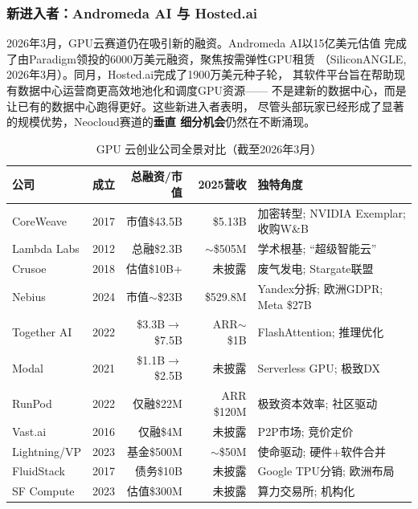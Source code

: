 \subsubsection{新进入者：Andromeda AI 与 Hosted.ai}
2026年3月，GPU云赛道仍在吸引新的融资。Andromeda AI以15亿美元估值
完成了由Paradigm领投的6000万美元融资，聚焦按需弹性GPU租赁
（SiliconANGLE, 2026年3月）。同月，Hosted.ai完成了1900万美元种子轮，
其软件平台旨在帮助现有数据中心运营商更高效地池化和调度GPU资源——
不是建新的数据中心，而是让已有的数据中心跑得更好。这些新进入者表明，
尽管头部玩家已经形成了显著的规模优势，Neocloud赛道的\textbf{垂直
细分机会}仍然在不断涌现。


\begin{table}[htbp]
\centering
\caption{GPU 云创业公司全景对比（截至2026年3月）}
\label{tab:gpu-cloud-comparison}
\small
\begin{tabularx}{\textwidth}{l c r r X}
\toprule
\rowcolor{figLightGray}
\textbf{公司} & \textbf{成立} & \textbf{总融资/市值}
  & \textbf{2025营收} & \textbf{独特角度} \\
\midrule
CoreWeave   & 2017 & 市值\$43.5B
  & \$5.13B & 加密转型; NVIDIA Exemplar; 收购W\&B \\
Lambda Labs & 2012 & 总融\$2.3B
  & $\sim$\$505M & 学术根基; ``超级智能云'' \\
Crusoe      & 2018 & 估值\$10B+
  & 未披露 & 废气发电; Stargate联盟 \\
Nebius      & 2024 & 市值$\sim$\$23B
  & \$529.8M & Yandex分拆; 欧洲GDPR; Meta \$27B \\
Together AI & 2022 & \$3.3B$\to$\$7.5B
  & ARR$\sim$\$1B & FlashAttention; 推理优化 \\
Modal       & 2021 & \$1.1B$\to$\$2.5B
  & 未披露 & Serverless GPU; 极致DX \\
RunPod      & 2022 & 仅融\$22M
  & ARR \$120M & 极致资本效率; 社区驱动 \\
Vast.ai     & 2016 & 仅融\$4M
  & 未披露 & P2P市场; 竞价定价 \\
Lightning/VP& 2023 & 基金\$500M
  & $\sim$\$50M & 使命驱动; 硬件+软件合并 \\
FluidStack  & 2017 & 债务\$10B
  & 未披露 & Google TPU分销; 欧洲布局 \\
SF Compute  & 2023 & 估值\$300M
  & 未披露 & 算力交易所; 机构化 \\
\bottomrule
\end{tabularx}
\end{table}


